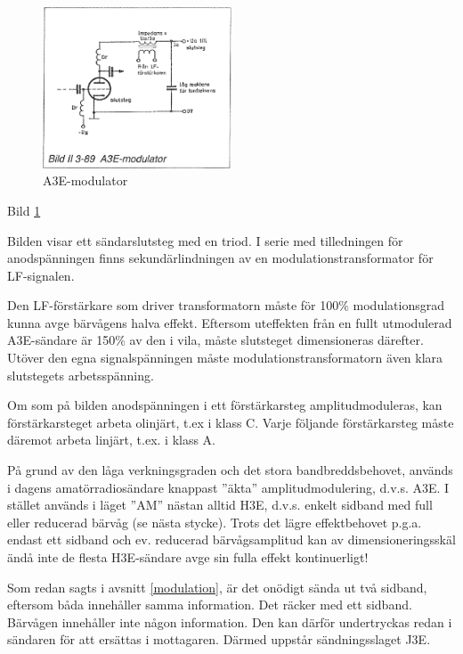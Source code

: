 \begin{figure}
\includegraphics[width=0.5\textwidth]{images/bild_2_3-89}
\caption{A3E-modulator}
\label{fig:BildII3-89}
\end{figure}

Bild \ref{fig:BildII3-89}

Bilden visar ett sändarslutsteg med en triod.  I serie med
tilledningen för anodspänningen finns sekundärlindningen av en
modulationstransformator för LF-signalen.

Den LF-förstärkare som driver transformatorn måste för 100\%
modulationsgrad kunna avge bärvågens halva effekt. Eftersom uteffekten
från en fullt utmodulerad A3E-sändare är 150\% av den i vila, måste
slutsteget dimensioneras därefter. Utöver den egna signalspänningen
måste modulationstransformatorn även klara slutstegets arbetsspänning.

Om som på bilden anodspänningen i ett förstärkarsteg amplitudmoduleras,
kan förstärkarsteget arbeta olinjärt, t.ex i klass C.
Varje följande förstärkarsteg måste däremot arbeta linjärt, t.ex. i klass A.

På grund av den låga verkningsgraden och det stora bandbreddsbehovet,
används i dagens amatörradiosändare knappast ''äkta''
amplitudmodulering, d.v.s. A3E. I stället används i läget ''AM'' nästan
alltid H3E, d.v.s. enkelt sidband med full eller reducerad bärvåg (se
nästa stycke). Trots det lägre effektbehovet p.g.a. endast ett sidband
och ev. reducerad bärvågsamplitud kan av dimensioneringsskäl ändå inte
de flesta H3E-sändare avge sin fulla effekt kontinuerligt!

Som redan sagts i avsnitt \ref{modulation}, är det onödigt sända ut två sidband,
eftersom båda innehåller samma information. Det räcker med ett
sidband. Bärvågen innehåller inte någon information. Den kan därför
undertryckas redan i sändaren för att ersättas i mottagaren. Därmed
uppstår sändningsslaget J3E.


